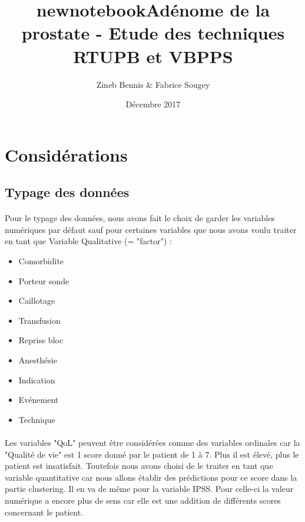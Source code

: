 \documentclass[11pt]{article}
\title{newnotebook}
\title{Adénome de la prostate - Etude des techniques RTUPB et VBPPS}
\author{Zineb Bennis \& Fabrice Sougey}
\date{ Décembre 2017 }
\providecommand{\tightlist}{%
      \setlength{\itemsep}{0pt}\setlength{\parskip}{0pt}}
\begin{document}
    
    
    \maketitle
    \thispagestyle{empty}
    
    \newpage
    \tableofcontents
    
    \newpage
    

    
    \section{Considérations}\label{considuxe9rations}

    \subsection{Typage des données}\label{typage-des-donnuxe9es}

\paragraph{}
Pour le typage des données, nous avons fait le choix de garder les
variables numériques par défaut sauf pour certaines variables que nous
avons voulu traiter en tant que Variable Qualitative (= "factor") :
\begin{itemize}
\tightlist
\item Comorbidite\item Porteur sonde\item Caillotage\item Transfusion\item Reprise bloc
\item Anesthésie\item Indication\item Evénement\item Technique\medbreak
\end{itemize}

\paragraph{}
Les variables "QoL" peuvent être considérées comme des variables
ordinales car la "Qualité de vie" est 1 score donné par le patient de 1
à 7. Plus il est élevé, plus le patient est insatisfait. Toutefois nous
avons choisi de le traiter en tant que variable quantitative car nous
allons établir des prédictions pour ce score dans la partie clustering.
Il en va de même pour la variable IPSS. Pour celle-ci la valeur
numérique a encore plus de sens car elle est une addition de différents
scores concernant le patient.
\end{document}

